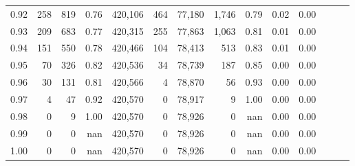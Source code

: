 \begin{tabular}{rrrrrrrrrrrrrr}
0.92 &    258 &    819 &  0.76 &  420,106 &      464 &  77,180 &   1,746 &  0.79 &  0.02 &      0.00 \\
0.93 &    209 &    683 &  0.77 &  420,315 &      255 &  77,863 &   1,063 &  0.81 &  0.01 &      0.00 \\
0.94 &    151 &    550 &  0.78 &  420,466 &      104 &  78,413 &     513 &  0.83 &  0.01 &      0.00 \\
0.95 &     70 &    326 &  0.82 &  420,536 &       34 &  78,739 &     187 &  0.85 &  0.00 &      0.00 \\
0.96 &     30 &    131 &  0.81 &  420,566 &        4 &  78,870 &      56 &  0.93 &  0.00 &      0.00 \\
0.97 &      4 &     47 &  0.92 &  420,570 &        0 &  78,917 &       9 &  1.00 &  0.00 &      0.00 \\
0.98 &      0 &      9 &  1.00 &  420,570 &        0 &  78,926 &       0 &   nan &  0.00 &      0.00 \\
0.99 &      0 &      0 &   nan &  420,570 &        0 &  78,926 &       0 &   nan &  0.00 &      0.00 \\
1.00 &      0 &      0 &   nan &  420,570 &        0 &  78,926 &       0 &   nan &  0.00 &      0.00 \\
\bottomrule
\end{tabular}
